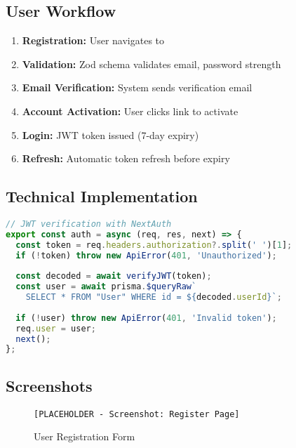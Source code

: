 \subsection{User Workflow}

\begin{enumerate}[leftmargin=*]
    \item \textbf{Registration:} User navigates to 
    \item \textbf{Validation:} Zod schema validates email, password strength
    \item \textbf{Email Verification:} System sends verification email
    \item \textbf{Account Activation:} User clicks link to activate
    \item \textbf{Login:} JWT token issued (7-day expiry)
    \item \textbf{Refresh:} Automatic token refresh before expiry
\end{enumerate}

\subsection{Technical Implementation}

\begin{lstlisting}[language=JavaScript, caption={Authentication Middleware}]
// JWT verification with NextAuth
export const auth = async (req, res, next) => {
  const token = req.headers.authorization?.split(' ')[1];
  if (!token) throw new ApiError(401, 'Unauthorized');
  
  const decoded = await verifyJWT(token);
  const user = await prisma.$queryRaw`
    SELECT * FROM "User" WHERE id = ${decoded.userId}`;
  
  if (!user) throw new ApiError(401, 'Invalid token');
  req.user = user;
  next();
};
\end{lstlisting}

\subsection{Screenshots}

\begin{figure}[H]
\centering
\texttt{[PLACEHOLDER - Screenshot: Register Page]}
\caption{User Registration Form}
\label{fig:auth-register}
\end{figure}


